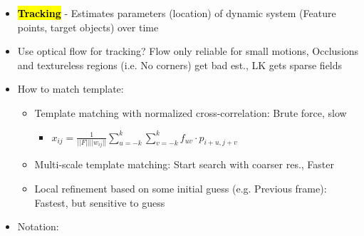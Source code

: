 \documentclass{article}
\newcommand{\keyword}[2]{\sethlcolor{highlight}\hl{\textbf{#1}} - #2}
\begin{document}
\begin{multicols*}{4}
\begin{itemize}
    \item \keyword{Tracking}{Estimates parameters (location) of dynamic system (Feature points, target objects) over time}
    \item Use optical flow for tracking? Flow only reliable for small motions, Occlusions and textureless regions (i.e. No corners) get bad est., LK gets sparse fields
    \item How to match template:
    \begin{itemize}
        \item Template matching with normalized cross-correlation: Brute force, slow
        \begin{itemize}
            \item $x_{ij} = \frac{1}{||F||||w_{ij}||} \sum_{u=-k}^{k} \sum_{v=-k}^{k} f_{uv} \cdot p_{i+u,j+v}$
        \end{itemize}
        \item Multi-scale template matching: Start search with coarser res., Faster
        \item Local refinement based on some initial guess (e.g. Previous frame): Fastest, but sensitive to guess
    \end{itemize}
    \item Notation:
\end{itemize}
\end{multicols*}
\end{document}
